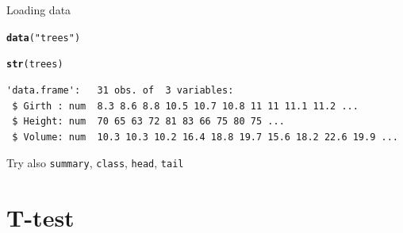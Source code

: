 \documentclass[10pt]{beamer}\usepackage[]{graphicx}\usepackage[]{color}
\makeatletter
\newcommand{\hlstr}[1]{\textcolor[rgb]{0.192,0.494,0.8}{#1}}%
\newcommand{\hlstd}[1]{\textcolor[rgb]{0.345,0.345,0.345}{#1}}%
\newcommand{\hlkwd}[1]{\textcolor[rgb]{0.737,0.353,0.396}{\textbf{#1}}}%
\newenvironment{kframe}{%
 \def\at@end@of@kframe{}%
 \ifinner\ifhmode%
  \def\at@end@of@kframe{\end{minipage}}%
  \begin{minipage}{\columnwidth}%
 \fi\fi%
 \def\FrameCommand##1{\hskip\@totalleftmargin \hskip-\fboxsep
 \colorbox{shadecolor}{##1}\hskip-\fboxsep
     \hskip-\linewidth \hskip-\@totalleftmargin \hskip\columnwidth}%
 \MakeFramed {\advance\hsize-\width
   \@totalleftmargin\z@ \linewidth\hsize
   \@setminipage}}%
 {\par\unskip\endMakeFramed%
 \at@end@of@kframe}
\newenvironment{knitrout}{}{} %
\makeatother
\begin{document}
\begin{frame}[fragile]{Loading data}
  
\begin{knitrout}
\color{fgcolor}\begin{kframe}
\begin{alltt}
  \hlkwd{data}\hlstd{(}\hlstr{"trees"}\hlstd{)}
\end{alltt}
\end{kframe}
\end{knitrout}
  \pause
  
\begin{knitrout}
\color{fgcolor}\begin{kframe}
\begin{alltt}
\hlkwd{str}\hlstd{(trees)}
\end{alltt}
\begin{verbatim}
'data.frame':	31 obs. of  3 variables:
 $ Girth : num  8.3 8.6 8.8 10.5 10.7 10.8 11 11 11.1 11.2 ...
 $ Height: num  70 65 63 72 81 83 66 75 80 75 ...
 $ Volume: num  10.3 10.3 10.2 16.4 18.8 19.7 15.6 18.2 22.6 19.9 ...
\end{verbatim}
\end{kframe}
\end{knitrout}
  
  Try also \texttt{summary}, \texttt{class}, \texttt{head}, \texttt{tail}
\end{frame}



\section{T-test}
\end{document}
